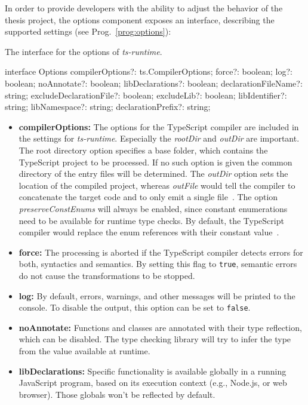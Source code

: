 In order to provide developers with the ability to adjust the behavior of the thesis project, the options component exposes an interface, describing the supported settings (see Prog.~\ref{prog:options}):
\begin{program}
\caption{The interface for the options of \emph{ts-runtime}.}
\label{prog:options}
\begin{JsCode}
interface Options {
  compilerOptions?: ts.CompilerOptions;
  force?: boolean;
  log?: boolean;
  noAnnotate?: boolean;
  libDeclarations?: boolean;
  declarationFileName?: string;
  excludeDeclarationFile?: boolean;
  excludeLib?: boolean;
  libIdentifier?: string;
  libNamespace?: string;
  declarationPrefix?: string;
}
\end{JsCode}
\end{program}
\begin{itemize}
  \item \textbf{compilerOptions:} The options for the TypeScript compiler are included in the settings for \emph{ts-runtime}. Especially the \emph{rootDir} and \emph{outDir} are important. The root directory option specifies a base folder, which contains the TypeScript project to be processed. If no such option is given the common directory of the entry files will be determined. The \emph{outDir} option sets the location of the compiled project, whereas \emph{outFile} would tell the compiler to concatenate the target code and to only emit a single file~\cite{TypeScriptHandbook:CompilerOptions}. The option \emph{preserveConstEnums} will always be enabled, since constant enumerations need to be available for runtime type checks. By default, the TypeScript compiler would replace the enum references with their constant value~\cites{TypeScriptHandbook:CompilerOptions, TypeScriptSpec:ConstEnums}.
  \item \textbf{force:} The processing is aborted if the TypeScript compiler detects errors for both, syntactics and semantics. By setting this flag to \texttt{true}, semantic errors do not cause the transformations to be stopped.
  \item \textbf{log:} By default, errors, warnings, and other messages will be printed to the console. To disable the output, this option can be set to \texttt{false}.
  \item \textbf{noAnnotate:} Functions and classes are annotated with their type reflection, which can be disabled. The type checking library will try to infer the type from the value available at runtime.
  \item \textbf{libDeclarations:} Specific functionality is available globally in a running JavaScript program, based on its execution context (e.g., Node.js, or web browser). Those globals won't be reflected by default.

\end{itemize}
